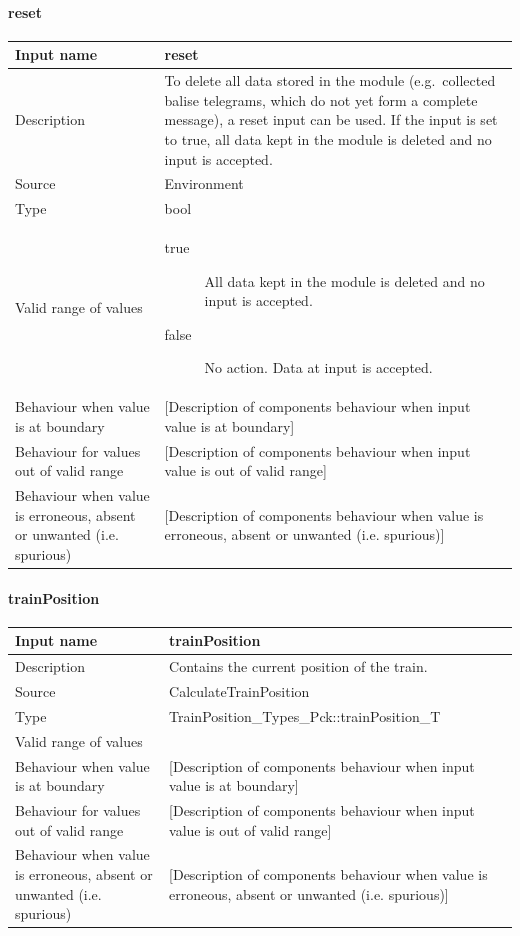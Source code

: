 \paragraph{reset}

\begin{longtable}{p{}p{}}
\toprule
Input name				& reset \\
\midrule
Description				& To delete all data stored in the module (e.g.~collected balise telegrams, which do not yet form a complete message), a reset input can be used. If the input is set to true, all data kept in the module is deleted and no input is accepted. \\
\midrule
Source					& Environment \\ 
\midrule
Type					& bool \\
\midrule
Valid range of values	& 
\begin{description}
\item[true] All data kept in the module is deleted and no input is accepted.
\item[false] No action. Data at input is accepted.
\end{description} \\
\midrule
Behaviour when value is at boundary	& [Description of components behaviour when input value is at boundary] \\
\midrule
Behaviour for values out of valid range	& [Description of components behaviour when input value is out of valid range] \\
\midrule
Behaviour when value is erroneous, absent or unwanted (i.e. spurious) & [Description of components behaviour when value is erroneous, absent or unwanted (i.e. spurious)] \\
\bottomrule
\end{longtable}

\paragraph{trainPosition}

\begin{longtable}{p{}p{}}
\toprule
Input name				& trainPosition \\
\midrule
Description				& Contains the current position of the train. \\
\midrule
Source					& CalculateTrainPosition \\ 
\midrule
Type					& TrainPosition\_Types\_Pck::trainPosition\_T \\
\midrule
Valid range of values	& \\
\midrule
Behaviour when value is at boundary	& [Description of components behaviour when input value is at boundary] \\
\midrule
Behaviour for values out of valid range	& [Description of components behaviour when input value is out of valid range] \\
\midrule
Behaviour when value is erroneous, absent or unwanted (i.e. spurious) & [Description of components behaviour when value is erroneous, absent or unwanted (i.e. spurious)] \\
\bottomrule
\end{longtable}


